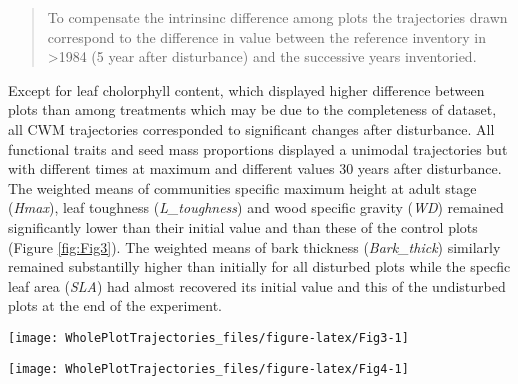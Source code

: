 \documentclass[fleqn,10pt]{ArtEcoFoG} %
\theoremstyle{definition}
\theoremstyle{definition}
\theoremstyle{definition}
\theoremstyle{remark}
\begin{document}
\begin{quote}
To compensate the intrinsinc difference among plots the trajectories
drawn correspond to the difference in value between the reference
inventory in \textgreater{}1984 (5 year after disturbance) and the
successive years inventoried.
\end{quote}

Except for leaf cholorphyll content, which displayed higher difference
between plots than among treatments which may be due to the completeness
of dataset, all CWM trajectories corresponded to significant changes
after disturbance. All functional traits and seed mass proportions
displayed a unimodal trajectories but with different times at maximum
and different values 30 years after disturbance. The weighted means of
communities specific maximum height at adult stage (\emph{Hmax}), leaf
toughness (\emph{L\_toughness}) and wood specific gravity (\emph{WD})
remained significantly lower than their initial value and than these of
the control plots (Figure \ref{fig:Fig3}). The weighted means of bark
thickness (\emph{Bark\_thick}) similarly remained substantilly higher
than initially for all disturbed plots while the specfic leaf area
(\emph{SLA}) had almost recovered its initial value and this of the
undisturbed plots at the end of the experiment.

\begin{figure*}

{\centering \texttt{[image: WholePlotTrajectories\_files/figure-latex/Fig3-1]} 

}

\caption{Trajectories of the communities weighted means (CWM) over 30 years after disturbance of 4 leaf traits (Leaf thickness, *L_thickness*, chlorophyll content, *L_chloro*, toughness, *L_toughness* and specific area, *SLA*), 2 stem traits (wood specific gravity, *WD*, and bark thickness, *Bark-thick*) and one life trait (Specific maximum height at adult stage,*Hmax*). Trajectories correspond to the median (solid line) and 0.025 and 0.975 percentile (gray envelope) observed after 50 iteration of the taxonomic uncertainty propagation and the missing trait value filling processes. Initial treatments are represented by solid lines colorswith green for control, blue for T1,orange for T2 and red for T3.}\label{fig:Fig3}
\end{figure*}

\begin{figure*}

{\centering \texttt{[image: WholePlotTrajectories\_files/figure-latex/Fig4-1]} 

}

\caption{Trajectories of seed mass classes proportions over 30 years after disturbance, corresponding to the median (solid line) and 0.025 and 0.975 percentile (gray envelope) observed after 50 iteration of the taxonomic uncertainty propagation. No gap filling process was applied in this case. Initial treatments are represented by solid lines colorswith green for control, blue for T1,orange for T2 and red for T3.}\label{fig:Fig4}
\end{figure*}
\end{document}
